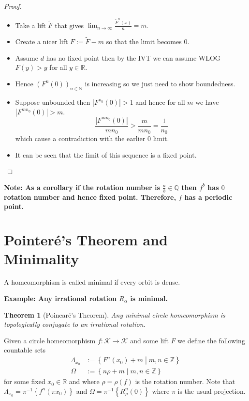 \documentclass[11pt]{article}
\newcommand{\defeq}{:=}
\newcommand{\abs}[1]{|#1|}
\newcommand{\relmiddle}[1]{\mathrel{}\middle#1\mathrel{}}
\newcommand{\rmv}{\relmiddle|}
\newcommand{\R}{\mathbb{R}}
\newcommand{\Z}{\mathbb{Z}}
\newcommand{\N}{\mathbb{N}}
\newcommand{\Q}{\mathbb{Q}}
\newenvironment{defin}
	{\begin{mdframed}[backgroundcolor=white, roundcorner=5pt, linewidth=1pt, linecolor=Green]
		\setlength{\parindent}{0pt}}
	{\end{mdframed}}
\newcommand{\mdf}[1]{{\color{Green} #1}}
\newenvironment{note}
	{\begin{mdframed}[backgroundcolor=white, linecolor=red, roundcorner=5pt, linewidth=1pt]\bfseries{Note:}\normalfont
	\setlength{\parindent}{0pt}}
	{\end{mdframed}}
\newenvironment{eg}
	{\begin{mdframed}[backgroundcolor=mylg,roundcorner=5pt,linewidth=0pt]\bfseries{Example:}\normalfont
	\setlength{\parindent}{0pt}}
	{\end{mdframed}}
\newtheorem{theorem}{Theorem}[section]
\begin{document}
\begin{proof}
\begin{itemize}
	\item Take a lift $\widetilde{F}$ that gives $\lim_{n\to\infty}\frac{\widetilde{F}^n(x)}{n}=m$.
	\item Create a nicer lift $F\defeq\widetilde{F}-m$ so that the limit becomes $0$.
	\item Assume $d$ has no fixed point then by the IVT we can assume WLOG $F(y) > y$ for all $y\in\R$.
	\item Hence $\left(F^n(0)\right)_{n\in\N}$ is increasing so we just need to show boundedness.
	\item Suppose unbounded then $\abs{F^{n_0}(0)}>1$ and hence for all $m$ we have $\abs{F^{mn_0}(0)} > m$.
		\[
			\frac{\abs{F^{mn_0}(0)}}{mn_0} > \frac{m}{mn_0} = \frac{1}{n_0}
		\]
		which cause a contradiction with the earlier $0$ limit.
	\item It can be seen that the limit of this sequence is a fixed point.
\end{itemize}
\end{proof}

\begin{note}
	As a corollary if the rotation number is $\frac{a}{b}\in\Q$ then $f^b$ has $0$ rotation number and hence fixed point.
	Therefore, $f$ has a periodic point.
\end{note}

\section{Pointer\'e's Theorem and Minimality}

\begin{defin}
	A homeomorphism is called \mdf{minimal} if every orbit is dense.	
\end{defin}

\begin{eg}
Any irrational rotation $R_\alpha$ is minimal.
\end{eg}

\begin{theorem}[Poincar\'e's Theorem]
Any minimal circle homeomorphism is topologically conjugate to an irrational rotation.
\end{theorem}

Given a circle homeomorphism $f:\mathcal{K}\to\mathcal{K}$ and some lift $F$ we define the following countable sets
\begin{align*}
	\Lambda_{x_0}&\defeq\left\{F^n(x_0)+m \rmv m, n\in \Z\right\}\\
	\Omega &\defeq \left\{n \rho +m \rmv m, n \in \Z\right\}
\end{align*}
for some fixed $x_0\in\R$ and where $\rho = \rho(f)$ is the rotation number.
Note that $\Lambda_{x_0}=\pi^{-1}\left\{f^n(\pi x_0)\right\}$ and $\Omega=\pi^{-1}\left\{R_\rho ^n (0)\right\}$ where $\pi$ is the usual projection.
\end{document}
